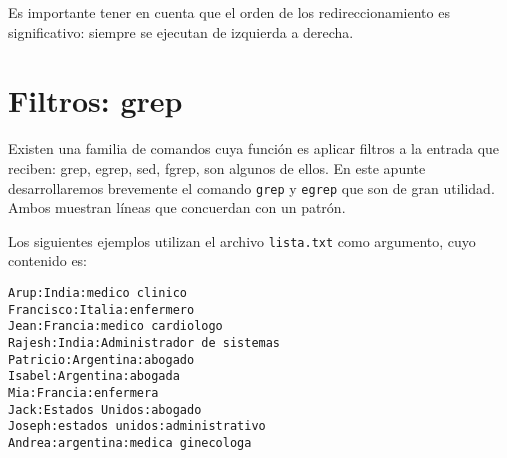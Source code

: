 \documentclass[12pt]{article}
\begin{document}
Es importante tener en cuenta que el orden de los redireccionamiento es 
significativo: siempre se ejecutan de izquierda a derecha.

\section{Filtros: grep}
Existen una familia de comandos cuya función es aplicar filtros a la entrada que 
reciben: grep, egrep, sed, fgrep, son algunos de ellos. En este apunte desarrollaremos brevemente el 
comando \texttt{grep} y \texttt{egrep} que son de gran utilidad. Ambos muestran 
líneas que concuerdan con un patrón. 

Los siguientes ejemplos utilizan el archivo \texttt{lista.txt} como argumento, cuyo 
contenido es: 

\texttt{Arup:India:medico clinico \\
Francisco:Italia:enfermero \\
Jean:Francia:medico cardiologo \\
Rajesh:India:Administrador de sistemas \\
Patricio:Argentina:abogado\\
Isabel:Argentina:abogada\\
Mia:Francia:enfermera\\
Jack:Estados Unidos:abogado\\
Joseph:estados unidos:administrativo\\
Andrea:argentina:medica ginecologa
}
\end{document}
